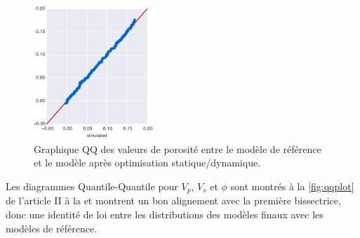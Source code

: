 \begin{figure}[!ht]
\centering
\includegraphics[width=0.4\textwidth]{fig/qqplot_2.pdf}
\caption{Graphique QQ des valeurs de porosité entre le modèle de référence et le
modèle après optimisation statique/dynamique.}
\label{fig:qqplot_2}
\end{figure}
Les diagrammes Quantile-Quantile pour $V_p$, $V_s$ et $\phi$ sont montrés à la
\cref{fig:qqplot} de l'article II à la  et montrent un bon
alignement avec la première bissectrice, donc une identité de loi entre les
distributions des modèles finaux avec les modèles de référence. \\


